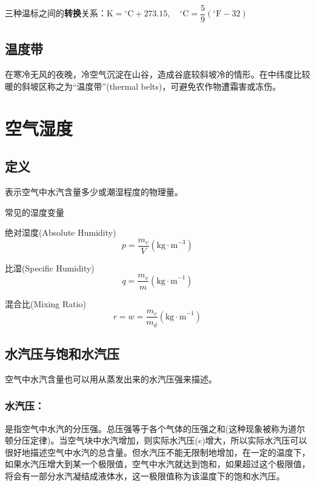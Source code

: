 \documentclass[UTF8,a4paper,11pt,oneside]{ctexbook}
\begin{document}
三种温标之间的\textbf{转换}关系：\(\mathrm{K}={}^\circ\mathrm{C}+273.15,\quad^\circ\mathrm{C}=\dfrac{5}{9}(^\circ\mathrm{F}-32)\)

\subsection{温度带}

在寒冷无风的夜晚，冷空气沉淀在山谷，造成谷底较斜坡冷的情形。在中纬度比较暖的斜坡区称之为“温度带”(thermal belts)，可避免农作物遭霜害或冻伤。

\section{空气湿度}

\subsection{定义}

表示空气中水汽含量多少或潮湿程度的物理量。

常见的湿度变量

绝对湿度(Absolute Humidity)
\begin{equation}
p=\dfrac{m_v}{V}(\mathrm{kg\cdot{}m}^{-3})
\end{equation}

比湿(Specific Humidity)
\begin{equation}
q=\dfrac{m_v}{m}(\mathrm{kg\cdot{}m}^{-1})
\end{equation}

混合比(Mixing Ratio)
\begin{equation}
r=w=\dfrac{m_v}{m_d}(\mathrm{kg\cdot{}m}^{-1})
\end{equation}

\subsection{水汽压与饱和水汽压}

空气中水汽含量也可以用从蒸发出来的水汽压强来描述。

\subsubsection{水汽压：}

是指空气中水汽的分压强。总压强等于各个气体的压强之和(这种现象被称为道尔顿分压定律)。当空气块中水汽增加，则实际水汽压(\(e\))增大，所以实际水汽压可以很好地描述空气中水汽的总含量。但水汽压不能无限制地增加，在一定的温度下，如果水汽压增大到某一个极限值，空气中水汽就达到饱和，如果超过这个极限值，将会有一部分水汽凝结成液体水，这一极限值称为该温度下的饱和水汽压。
\end{document}
